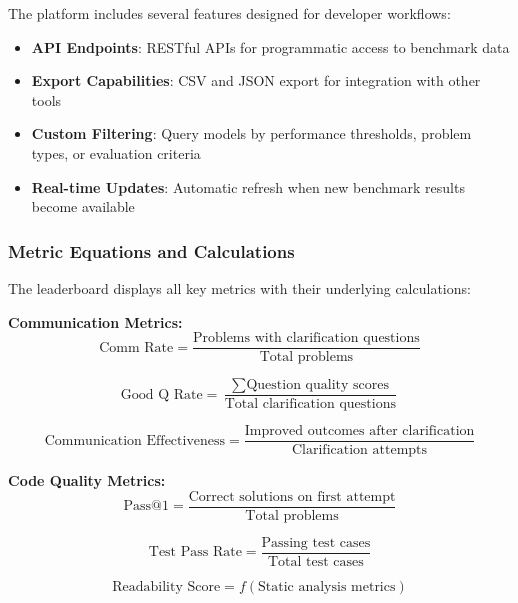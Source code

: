 \documentclass[conference]{IEEEtran}
\begin{document}
The platform includes several features designed for developer workflows:

\begin{itemize}
    \item \textbf{API Endpoints}: RESTful APIs for programmatic access to benchmark data
    \item \textbf{Export Capabilities}: CSV and JSON export for integration with other tools
    \item \textbf{Custom Filtering}: Query models by performance thresholds, problem types, or evaluation criteria
    \item \textbf{Real-time Updates}: Automatic refresh when new benchmark results become available
\end{itemize}

\subsubsection{Metric Equations and Calculations}

The leaderboard displays all key metrics with their underlying calculations:

\textbf{Communication Metrics:}
\begin{equation}
\text{Comm Rate} = \frac{\text{Problems with clarification questions}}{\text{Total problems}}
\end{equation}

\begin{equation}
\text{Good Q Rate} = \frac{\sum \text{Question quality scores}}{\text{Total clarification questions}}
\end{equation}

\begin{equation}
\text{Communication Effectiveness} = \frac{\text{Improved outcomes after clarification}}{\text{Clarification attempts}}
\end{equation}

\textbf{Code Quality Metrics:}
\begin{equation}
\text{Pass@1} = \frac{\text{Correct solutions on first attempt}}{\text{Total problems}}
\end{equation}

\begin{equation}
\text{Test Pass Rate} = \frac{\text{Passing test cases}}{\text{Total test cases}}
\end{equation}

\begin{equation}
\text{Readability Score} = f(\text{Static analysis metrics})
\end{equation}
\end{document}
